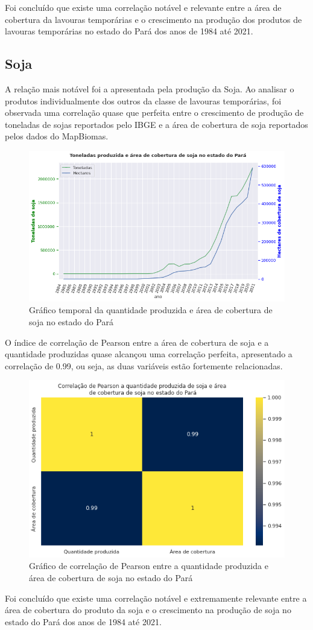 Foi concluído que existe uma correlação notável e relevante entre a área de cobertura da lavouras temporárias e o crescimento na produção dos produtos de lavouras temporárias no estado do Pará dos anos de 1984 até 2021.





\subsection{Soja}

A relação mais notável foi a apresentada pela produção da Soja. Ao analisar o produtos individualmente dos outros da classe de lavouras temporárias, foi observada uma correlação quase que perfeita entre o crescimento de produção de toneladas de sojas reportados pelo IBGE e a área de cobertura de soja reportados pelos dados do MapBiomas.


\begin{figure}[hbt!]
    \centering
    \includegraphics[width=0.6\columnwidth]{src/plots/plot-soja.png}
    \centering
    \caption{Gráfico temporal da quantidade produzida e área de cobertura de soja no estado do Pará}
    \label{fig:cobertura_pastagem-numero_cabeca}
\end{figure}

O índice de correlação de Pearson entre a área de cobertura de soja e a quantidade produzidas quase alcançou uma correlação perfeita, apresentado a correlação de 0.99, ou seja, as duas variáveis estão fortemente relacionadas.

\begin{figure}[hbt!]
    \centering
    \includegraphics[width=0.6\columnwidth]{src/plots/plot_correlacao-soja.png}
    \centering
    \caption{Gráfico de correlação de Pearson entre a quantidade produzida e área de cobertura de soja no estado do Pará}
    \label{fig:correlacao-cobertura_pastagem-numero_cabecas}
\end{figure}

Foi concluído que existe uma correlação notável e extremamente relevante entre a área de cobertura do produto da soja e o crescimento na produção de soja no estado do Pará dos anos de 1984 até 2021.
